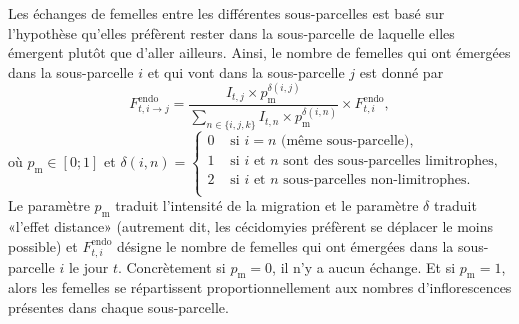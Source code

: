 Les échanges de femelles entre les différentes sous-parcelles est basé sur l'hypothèse qu'elles préfèrent rester dans la sous-parcelle de laquelle elles émergent plutôt que d'aller ailleurs.
Ainsi, le nombre de femelles qui ont émergées dans la sous-parcelle $i$ et qui vont dans la sous-parcelle $j$ est donné par
\[
F_{t, i \rightarrow j}^{\text{endo}} = \frac{I_{t, j} \times p_{\text{m}}^{\delta(i, j)}}{\sum_{n\in \{i,j,k\}} I_{t, n} \times p_{\text{m}}^{\delta(i, n)}}\times F_{t, i}^{\text{endo}},
\]
où $p_{\text{m}} \in [0; 1]$ et $\delta(i, n) =
\begin{cases}
0 & \text{ si } i=n \text{ (même sous-parcelle),}\\
1 & \text{ si $i$ et $n$ sont des sous-parcelles limitrophes,}\\
2 & \text{ si $i$ et $n$ sous-parcelles non-limitrophes.}\\
\end{cases}$\\
Le paramètre $p_{\text{m}}$ traduit l'intensité de la migration et le paramètre $\delta$ traduit «l'effet distance» (autrement dit, les cécidomyies préfèrent se déplacer le moins possible) et $F_{t, i}^{\text{endo}}$ désigne le nombre de femelles qui ont émergées dans la sous-parcelle $i$ le jour $t$.
Concrètement si $p_{\text{m}} = 0$, il n'y a aucun échange.
Et si $p_{\text{m}} = 1$, alors les femelles se répartissent proportionnellement aux nombres d'inflorescences présentes dans chaque sous-parcelle.

